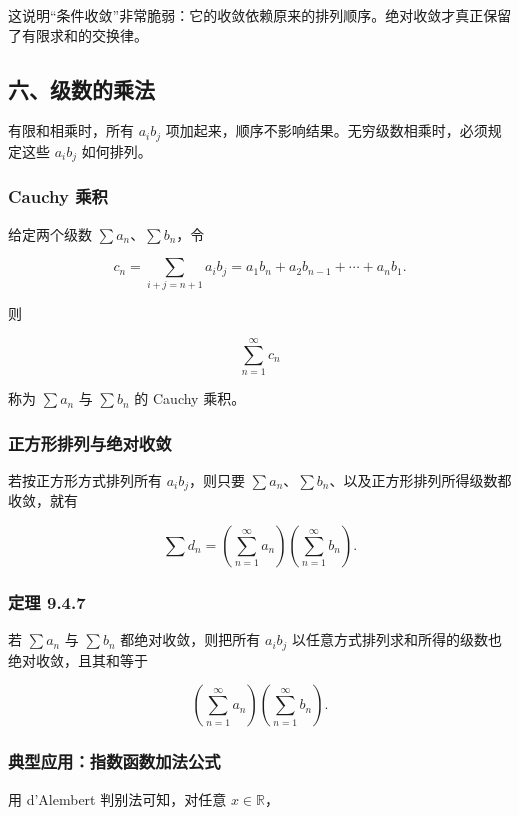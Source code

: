\begin{notebox}
这说明“条件收敛”非常脆弱：它的收敛依赖原来的排列顺序。绝对收敛才真正保留了有限求和的交换律。
\end{notebox}

\subsection*{六、级数的乘法}

有限和相乘时，所有 \(a_ib_j\) 项加起来，顺序不影响结果。无穷级数相乘时，必须规定这些 \(a_ib_j\) 如何排列。

\subsubsection*{Cauchy 乘积}

给定两个级数 \(\sum a_n\)、\(\sum b_n\)，令

\[
      c_n=\sum_{i+j=n+1}a_ib_j
      =
      a_1b_n+a_2b_{n-1}+\cdots+a_nb_1.
    \]

则

\[
      \sum_{n=1}^{\infty}c_n
    \]

称为 \(\sum a_n\) 与 \(\sum b_n\) 的 Cauchy 乘积。

\subsubsection*{正方形排列与绝对收敛}

若按正方形方式排列所有 \(a_ib_j\)，则只要 \(\sum a_n\)、\(\sum b_n\)、以及正方形排列所得级数都收敛，就有

\[
      \sum d_n
      =
      \left(\sum_{n=1}^{\infty}a_n\right)
      \left(\sum_{n=1}^{\infty}b_n\right).
    \]

\subsubsection*{定理 9.4.7}

若 \(\sum a_n\) 与 \(\sum b_n\) 都绝对收敛，则把所有 \(a_ib_j\) 以任意方式排列求和所得的级数也绝对收敛，且其和等于

\[
      \left(\sum_{n=1}^{\infty}a_n\right)
      \left(\sum_{n=1}^{\infty}b_n\right).
    \]

\subsubsection*{典型应用：指数函数加法公式}

用 d'Alembert 判别法可知，对任意 \(x\in\mathbb R\)，

